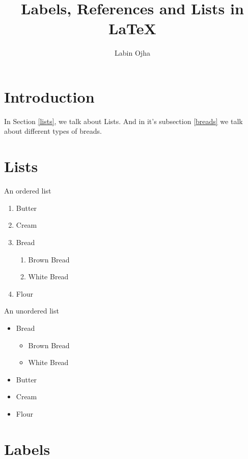 \documentclass{article}
\author{Labin Ojha}
\title{Labels, References and Lists in {\LaTeX}}
\begin{document}
\maketitle

\section{Introduction}

In Section \ref{lists}, we talk about Lists.
And in it's subsection \ref{breads} we talk about different types of breads.


\section{Lists\label{lists}}

An ordered list
\begin{enumerate}
    \item Butter
    \item Cream
    \item Bread
    \begin{enumerate}\label{breads}
        \item Brown Bread
        \item White Bread
    \end{enumerate}
    \item Flour
\end{enumerate}


An unordered list
\begin{itemize}
    \item Bread
    \begin{itemize}
        \item Brown Bread
        \item White Bread
    \end{itemize}
    \item Butter
    \item Cream
    \item Flour
\end{itemize}

\section{Labels}
\end{document}
